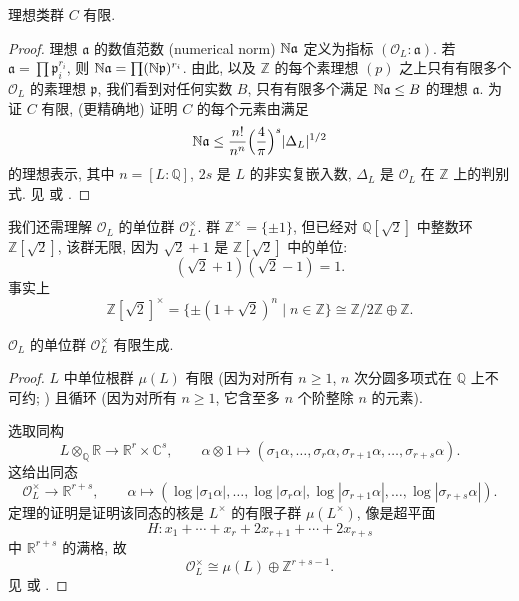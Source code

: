 \begin{theorem}[类数有限性] \label{thm:4.3.10} 
理想类群 $C$ 有限.
\end{theorem}

\begin{proof}
理想 $\mathfrak{a}$ 的数值范数 (numerical norm) $\mathbb{N}\mathfrak{a}$ 定义为指标 $(\mathcal{O}_L:\mathfrak{a})$. 若 $\mathfrak{a} = \prod\mathfrak{p}_i^{r_i}$, 则 $\mathbb{N}\mathfrak{a} = \prod(\mathbb{N}\mathfrak{p})^{r_i}$. 由此, 以及 $\mathbb{Z}$ 的每个素理想 $(p)$ 之上只有有限多个 $\mathcal{O}_L$ 的素理想 $\mathfrak{p}$, 我们看到对任何实数 $B$, 只有有限多个满足 $\mathbb{N}\mathfrak{a}\le B$ 的理想 $\mathfrak{a}$. 为证 $C$ 有限, (更精确地) 证明 $C$ 的每个元素由满足
\[
\mathbb{N}\mathfrak{a}\le\frac{n!}{n^n}\Bigl(\frac{4}{\pi}\Bigr)^s|\Delta_L|^{1/2}
\]
的理想表示, 其中 $n = [L:\mathbb{Q}]$, $2s$ 是 $L$ 的非实复嵌入数, $\Delta_L$ 是 $\mathcal{O}_L$ 在 $\mathbb{Z}$ 上的判别式. 见 \cite[4.3]{milne-ant} 或 \cite[\S 4.3]{samuel2008}.
\end{proof}

我们还需理解 $\mathcal{O}_L$ 的单位群 $\mathcal{O}_L^{\times}$. 群 $\mathbb{Z}^{\times} = \{\pm 1\}$, 但已经对 $\mathbb{Q}[\sqrt{2}]$ 中整数环 $\mathbb{Z}[\sqrt{2}]$, 该群无限, 因为 $\sqrt{2}+1$ 是 $\mathbb{Z}[\sqrt{2}]$ 中的单位:
\[
(\sqrt{2}+1)(\sqrt{2}-1) = 1.
\]
事实上
\[
\mathbb{Z}[\sqrt{2}]^{\times} = \{\pm(1+\sqrt{2})^n \mid n\in\mathbb{Z}\}\cong\mathbb{Z}/2\mathbb{Z}\oplus\mathbb{Z}.
\]

\begin{theorem} \label{thm:4.3.11} 
$\mathcal{O}_L$ 的单位群 $\mathcal{O}_L^{\times}$ 有限生成.
\end{theorem}

\begin{proof}
$L$ 中单位根群 $\mu(L)$ 有限 (因为对所有 $n\ge 1$, $n$ 次分圆多项式在 $\mathbb{Q}$ 上不可约; \cite[5.9]{milne-ft}) 且循环 (因为对所有 $n\ge 1$, 它含至多 $n$ 个阶整除 $n$ 的元素).

选取同构
\[
L\otimes_{\mathbb{Q}}\mathbb{R}\to\mathbb{R}^r\times\mathbb{C}^s, \qquad
\alpha\otimes 1\mapsto(\sigma_1\alpha, \dots, \sigma_r\alpha, \sigma_{r+1}\alpha, \dots, \sigma_{r+s}\alpha).
\]
这给出同态
\[
\mathcal{O}_L^{\times}\to\mathbb{R}^{r+s}, \qquad
\alpha\mapsto(\log|\sigma_1\alpha|, \dots, \log|\sigma_r\alpha|, \log|\sigma_{r+1}\alpha|, \dots, \log|\sigma_{r+s}\alpha|).
\]
定理的证明是证明该同态的核是 $L^{\times}$ 的有限子群 $\mu(L^{\times})$, 像是超平面
\[
H\colon x_1 + \cdots + x_r + 2x_{r+1} + \cdots + 2x_{r+s}
\]
中 $\mathbb{R}^{r+s}$ 的满格, 故
\[
\mathcal{O}_L^{\times}\cong\mu(L)\oplus\mathbb{Z}^{r+s-1}.
\]
见 \cite[Chapter 5]{milne-ant} 或 \cite[\S 4.4]{samuel2008}.
\end{proof}

